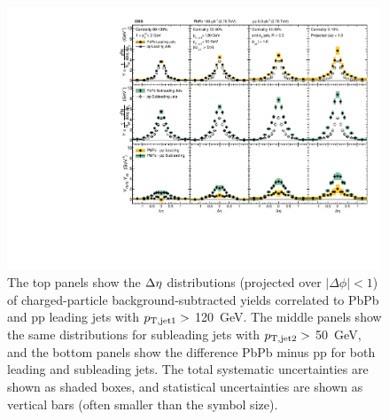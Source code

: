 \begin{figure}[hbtp]
\begin{center}
\includegraphics[width=0.99\textwidth]{figures/Results/PAS_Figure_5_TrkPt1_TrkPt2.pdf}
\caption[Dijet $\Delta\eta$ correlations for tracks with $1 < p_{\rm T}^{\rm trk} < 2$ GeV at 2.76 TeV]{The top panels show the $\protect\Delta\eta$ distributions (projected over $|\Delta\phi| < 1$) of charged-particle background-subtracted yields correlated to PbPb and pp leading jets with $p_{\rm T, jet1}>$ 120~GeV.  The middle panels show the same distributions for subleading jets with $p_{\rm T, jet2}>$ 50~GeV, and the bottom panels show the difference PbPb minus pp for both leading and subleading jets. The total systematic uncertainties are shown as shaded boxes, and statistical uncertainties are shown as vertical bars (often smaller than the symbol size).}
 \label{fig:fig2_dEta1}
   \end{center}
\end{figure}

